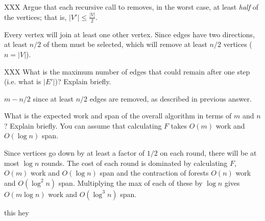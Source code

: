 \begin{problem}[4.]
XXX
\ask
Argue that each recursive call to  removes, in the worst
case, at least \emph{half} of the vertices; that is, $|V'| \leq \frac{|V|}{2}$.

\sol
Every vertex will join at least one other vertex. Since edges have
two directions, at least $n/2$ of them must be selected, which will remove
at least $n/2$ vertices ($n = |V|$).
\end{problem}

\begin{problem}[4.]
XXX
\ask
What is the maximum number of edges that could remain after one step
(i.e. what is $|E'|$)? Explain briefly.

\sol
$m - n/2$ since at least $n/2$ edges are removed, as described in
previous answer.
\end{problem}

\begin{problem}[5.]
\ask
What is the expected work and span of the overall algorithm in terms of
$m$ and $n$? Explain briefly. You can assume that calculating $F$ takes
$O(m)$ work and $O(\log n)$ span.

\sol
Since vertices go down by at least a factor of $1/2$ on each round,
there will be at most $\log n$ rounds.  The cost of each round is
dominated by calculating $F$, $O(m)$ work and $O(\log n)$ span and the
contraction of forests $O(n)$ work and $O(\log^2 n)$ span.
Multiplying the max of each of these by $\log n$ gives $O(m \log n)$ work
and $O(\log^3 n)$ span.
\end{problem}


\begin{problem}
\ask this
\solfin
hey 

\end{problem}
